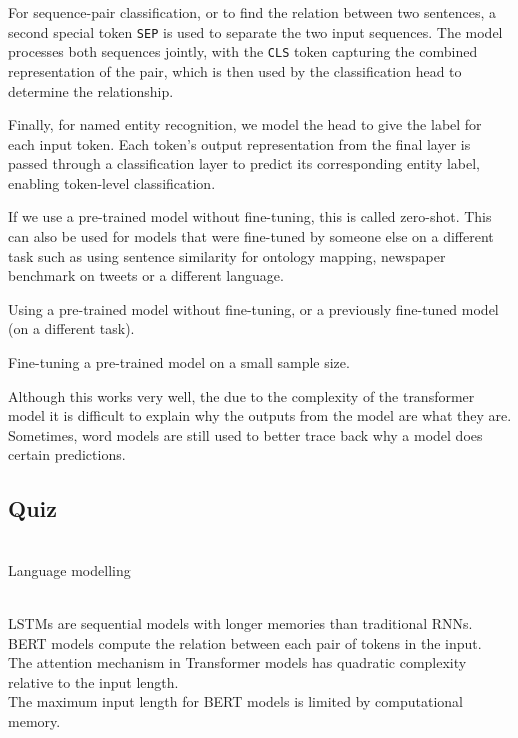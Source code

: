 For sequence-pair classification, or to find the relation between two sentences,
a second special token \texttt{SEP} is used to separate the two input sequences.
The model processes both sequences jointly, with the \texttt{CLS} token
capturing the combined representation of the pair, which is then used
by the classification head to determine the relationship.

Finally, for named entity recognition, we model the head to give the
label for each input token. Each token's output representation from the
final layer is passed through a classification layer to predict
its corresponding entity label, enabling token-level classification.

If we use a pre-trained model without fine-tuning, this is called zero-shot.
This can also be used for models that were fine-tuned by someone else
on a different
task such as using sentence similarity for ontology mapping,
newspaper benchmark on
tweets or a different language.

\begin{definition}
  Using a pre-trained model without fine-tuning, or a previously
  fine-tuned model (on a different task).
\end{definition}

\begin{definition}
  Fine-tuning a pre-trained model on a small sample size.
\end{definition}

Although this works very well, the due to the complexity of the
transformer model
it is difficult to explain why the outputs from the model are what
they are. Sometimes,
word models are still used to better trace back why a model does
certain predictions.

\subsection{Quiz}

\begin{quiz}
  ~\\
  Language modelling
\end{quiz}

\begin{quiz}
  ~\\
  LSTMs are sequential models with longer memories than traditional RNNs. \\
  BERT models compute the relation between each pair of tokens in the input. \\
  The attention mechanism in Transformer models has quadratic
  complexity relative to the input length. \\
  The maximum input length for BERT models is limited by
  computational memory. \\
\end{quiz}


